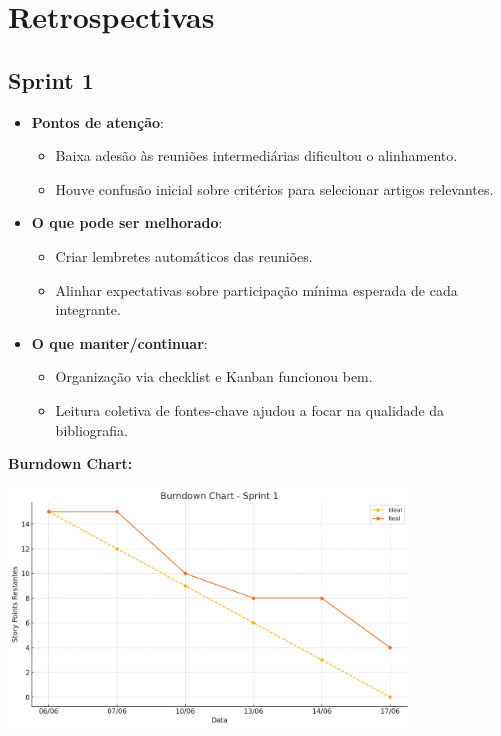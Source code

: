\section{Retrospectivas}

\subsection{Sprint 1}

\begin{itemize}
  \item \textbf{Pontos de atenção}:
  \begin{itemize}
    \item Baixa adesão às reuniões intermediárias dificultou o alinhamento.
    \item Houve confusão inicial sobre critérios para selecionar artigos relevantes.
  \end{itemize}

  \item \textbf{O que pode ser melhorado}:
  \begin{itemize}
    \item Criar lembretes automáticos das reuniões.
    \item Alinhar expectativas sobre participação mínima esperada de cada integrante.
  \end{itemize}

  \item \textbf{O que manter/continuar}:
  \begin{itemize}
    \item Organização via checklist e Kanban funcionou bem.
    \item Leitura coletiva de fontes-chave ajudou a focar na qualidade da bibliografia.
  \end{itemize}
\end{itemize}

\vspace{1em}
\noindent\textbf{Burndown Chart:}

\begin{center}
  \includegraphics[width=0.8\textwidth]{pictures/burndown_sprint1.png}
\end{center}

